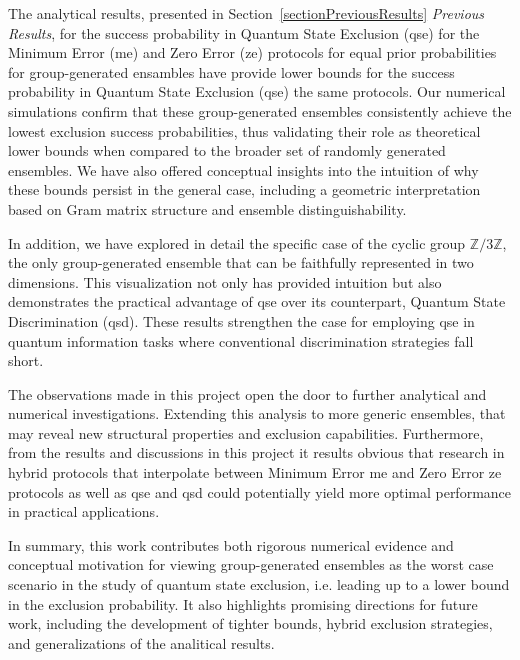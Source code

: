 \documentclass[12pt,letterpaper]{article}
\begin{document}
The analytical results, presented in Section~\ref{sectionPreviousResults} \emph{Previous Results}, for the success probability in Quantum State Exclusion (\gls{qse}) for the Minimum Error (\gls{me}) and Zero Error (\gls{ze}) protocols for equal prior probabilities for group-generated ensambles have provide lower bounds for the success probability in Quantum State Exclusion (\gls{qse}) the same protocols. Our numerical simulations confirm that these group-generated ensembles consistently achieve the lowest exclusion success probabilities, thus validating their role as theoretical lower bounds when compared to the broader set of randomly generated ensembles. We have also offered conceptual insights into the intuition of why these bounds persist in the general case, including a geometric interpretation based on Gram matrix structure and ensemble distinguishability.

In addition, we have explored in detail the specific case of the cyclic group $\mathbb{Z}/3\mathbb{Z}$, the only group-generated ensemble that can be faithfully represented in two dimensions. This visualization not only has provided intuition but also demonstrates the practical advantage of \gls{qse} over its counterpart, Quantum State Discrimination (\gls{qsd}). These results strengthen the case for employing \gls{qse} in quantum information tasks where conventional discrimination strategies fall short.

The observations made in this project open the door to further analytical and numerical investigations. Extending this analysis to more generic ensembles, that may reveal new structural properties and exclusion capabilities. Furthermore, from the results and discussions in this project it results obvious that research in hybrid protocols that interpolate between Minimum Error \gls{me} and Zero Error \gls{ze} protocols as well as \gls{qse} and \gls{qsd} could potentially yield more optimal performance in practical applications.

In summary, this work contributes both rigorous numerical evidence and conceptual motivation for viewing group-generated ensembles as the worst case scenario in the study of quantum state exclusion, i.e. leading up to a lower bound in the exclusion probability. It also highlights promising directions for future work, including the development of tighter bounds, hybrid exclusion strategies, and generalizations of the analitical results.

\newpage

 
\end{document}

